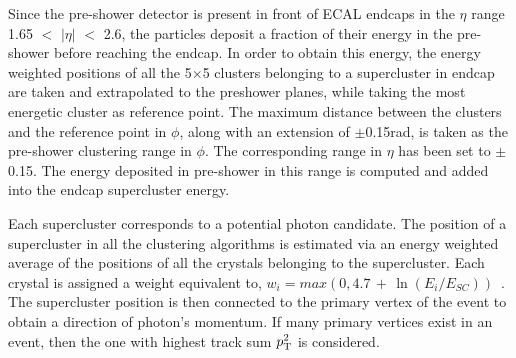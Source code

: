 Since the pre-shower detector is present in front of ECAL endcaps in the $\eta$ range 1.65 $<$ $|\eta|$ $<$ 2.6, the particles deposit a fraction of their energy in the
pre-shower before reaching the endcap. In order to obtain this energy, the energy weighted positions of all the 5$\times$5 clusters belonging to a supercluster
in endcap are taken and extrapolated to the preshower planes, while taking the most energetic cluster as reference point.
The maximum distance between the clusters and the
reference point in $\phi$, along with an extension of $\pm$0.15\unit{rad}, is taken as the pre-shower clustering range in $\phi$. The corresponding range in $\eta$ has been
set to $\pm$0.15. The energy deposited in pre-shower in this range is computed and added into the endcap supercluster energy.

Each supercluster corresponds to a potential photon candidate.
The position of a supercluster in all the clustering algorithms is estimated via an energy weighted average of the positions of all the crystals belonging to the
supercluster. Each crystal is assigned a weight equivalent to, $w_{i} = max(0,4.7\,+\,\ln(E_{i}/E_{SC}))$~\cite{Meschi:687345}.
The supercluster position is then connected to the primary vertex of the event to obtain a direction of photon's momentum.
If many primary vertices exist in an event, then the one with highest track sum ${p_{\mathrm T}^{\mathrm{2}}}$ is considered.

